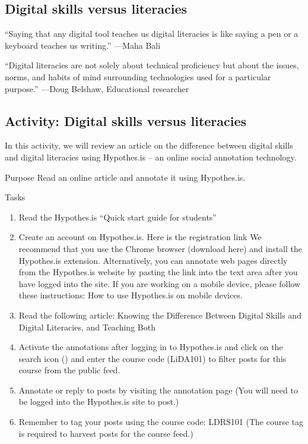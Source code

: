 \documentclass[
]{book}
\providecommand{\tightlist}{%
  \setlength{\itemsep}{0pt}\setlength{\parskip}{0pt}}
\theoremstyle{definition}
\theoremstyle{definition}
\theoremstyle{definition}
\theoremstyle{definition}
\theoremstyle{remark}
\begin{document}
\hypertarget{digital-skills-versus-literacies}{%
\subsection{Digital skills versus literacies}\label{digital-skills-versus-literacies}}

``Saying that any digital tool teaches us digital literacies is like saying a pen or a keyboard teaches us writing.''
---Maha Bali
\citet{Bali_Maha}

``Digital literacies are not solely about technical proficiency but about the issues, norms, and habits of mind surrounding technologies used for a particular purpose.''
---Doug Belshaw, Educational researcher

\hypertarget{activity-digital-skills-versus-literacies}{%
\subsection*{Activity: Digital skills versus literacies}\label{activity-digital-skills-versus-literacies}}

\begin{reflect}
In this activity, we will review an article on the difference between digital skills and digital literacies using Hypothes.is -- an online social annotation technology.

Purpose
Read an online article and annotate it using Hypothes.is.

Tasks

\begin{enumerate}
\def\labelenumi{\arabic{enumi}.}
\tightlist
\item
  Read the Hypothes.is ``Quick start guide for students''
\item
  Create an account on Hypothes.is. Here is the registration link
  We recommend that you use the Chrome browser (download here) and install the Hypothes.is extension. Alternatively, you can annotate web pages directly from the Hypothes.is website by pasting the link into the text area after you have logged into the site. If you are working on a mobile device, please follow these instructions: How to use Hypothes.is on mobile devices.
\item
  Read the following article: Knowing the Difference Between Digital Skills and Digital Literacies, and Teaching Both
\item
  Activate the annotations after logging in to Hypothes.is and click on the search icon () and enter the course code (LiDA101) to filter posts for this course from the public feed.
\item
  Annotate or reply to posts by visiting the annotation page (You will need to be logged into the Hypothes.is site to post.)
\item
  Remember to tag your posts using the course code: LDRS101 (The course tag is required to harvest posts for the course feed.)
\end{enumerate}
\end{reflect}
\end{document}
